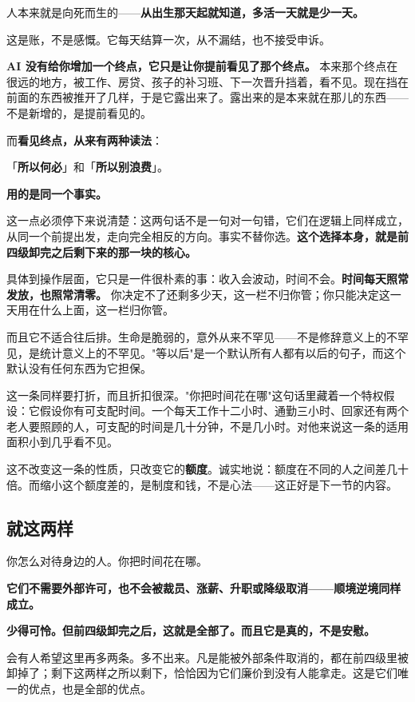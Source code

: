 \documentclass[11pt,a4paper]{ctexart}
\begin{document}
人本来就是向死而生的——\textbf{从出生那天起就知道，多活一天就是少一天。}

这是账，不是感慨。它每天结算一次，从不漏结，也不接受申诉。

\textbf{AI 没有给你增加一个终点，它只是让你提前看见了那个终点。} 本来那个终点在很远的地方，被工作、房贷、孩子的补习班、下一次晋升挡着，看不见。现在挡在前面的东西被推开了几样，于是它露出来了。露出来的是本来就在那儿的东西——不是新增的，是提前看见的。

而\textbf{看见终点，从来有两种读法}：

「\textbf{所以何必}」和「\textbf{所以别浪费}」。

\textbf{用的是同一个事实。}

这一点必须停下来说清楚：这两句话不是一句对一句错，它们在逻辑上同样成立，从同一个前提出发，走向完全相反的方向。事实不替你选。\textbf{这个选择本身，就是前四级卸完之后剩下来的那一块的核心。}

具体到操作层面，它只是一件很朴素的事：收入会波动，时间不会。\textbf{时间每天照常发放，也照常清零。} 你决定不了还剩多少天，这一栏不归你管；你只能决定这一天用在什么上面，这一栏归你管。

而且它不适合往后排。生命是脆弱的，意外从来不罕见——不是修辞意义上的不罕见，是统计意义上的不罕见。"等以后"是一个默认所有人都有以后的句子，而这个默认没有任何东西为它担保。

这一条同样要打折，而且折扣很深。"你把时间花在哪"这句话里藏着一个特权假设：它假设你有可支配时间。一个每天工作十二小时、通勤三小时、回家还有两个老人要照顾的人，可支配的时间是几十分钟，不是几小时。对他来说这一条的适用面积小到几乎看不见。

这不改变这一条的性质，只改变它的\textbf{额度}。诚实地说：额度在不同的人之间差几十倍。而缩小这个额度差的，是制度和钱，不是心法——这正好是下一节的内容。

\subsection{就这两样}

你怎么对待身边的人。你把时间花在哪。

\textbf{它们不需要外部许可，也不会被裁员、涨薪、升职或降级取消——顺境逆境同样成立。}

\textbf{少得可怜。但前四级卸完之后，这就是全部了。而且它是真的，不是安慰。}

会有人希望这里再多两条。多不出来。凡是能被外部条件取消的，都在前四级里被卸掉了；剩下这两样之所以剩下，恰恰因为它们廉价到没有人能拿走。这是它们唯一的优点，也是全部的优点。
\end{document}
